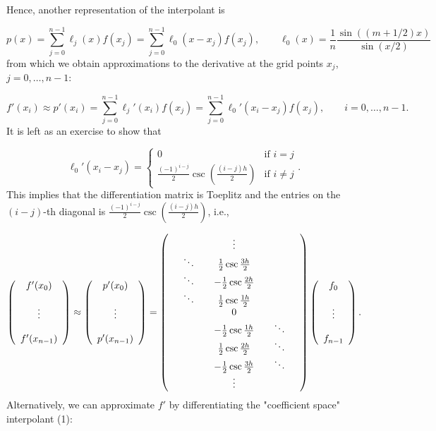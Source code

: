 \documentclass[12pt,landscape]{article}
\begin{document}
{Hence, another representation of the interpolant is

\[
p(x) = \sum_{j=0}^{n-1}\ell_j(x)f(x_j) = \sum_{j=0}^{n-1}\ell_0(x-x_j)f(x_j), \qquad \ell_0(x) = \frac{1}{n}\frac{\sin((m+1/2)x)}{\sin(x/2)}
\]
from which we obtain approximations to the derivative at the grid points $x_j$, $j = 0, \ldots, n-1$:

\[
f'(x_i) \approx p'(x_i) = \sum_{j=0}^{n-1}\ell_{j}'(x_i) f(x_{j})  = \sum_{j=0}^{n-1}\ell_{0}'(x_i-x_j)f(x_{j}), \qquad i = 0, \ldots, n-1.
\]
It is left as an exercise to show that

\[
\ell_{0}'(x_i-x_j) = \begin{cases}
 0 & \text{if } i = j \\
 \frac{(-1)^{i-j}}{2}\csc\left( \frac{(i-j)h}{2} \right)  & \text{if } i\neq j
\end{cases}.
\]
This implies that the differentiation matrix is Toeplitz and the entries on the $(i-j)$-th diagonal is $\frac{(-1)^{i-j}}{2}\csc\left( \frac{(i-j)h}{2} \right)$, i.e.,

\[
\left(
\begin{array}{c}
f'(x_0) \\
  \\
\vdots  \\
  \\
f'(x_{n-1})
\end{array}
\right) \approx 
\left(
\begin{array}{c}
p'(x_0) \\
  \\
\vdots  \\
  \\
p'(x_{n-1})
\end{array}
\right) = 
\left(
\begin{array}{c c c c c c c}
  &       &       & \vdots  &   &   & \\
  &\ddots &       & \frac{1}{2}\csc \frac{3h}{2}   &   &    &  \\
   &\ddots &      &-\frac{1}{2}\csc \frac{2h}{2}   &   &    &  \\ 
   &\ddots &      & \frac{1}{2}\csc \frac{1h}{2}   &   &    &   \\
  &        &      & 0                              &   &    &   \\
&      &      & -\frac{1}{2}\csc \frac{1h}{2}   &   &   \ddots &  \\
&      &      & \frac{1}{2}\csc \frac{2h}{2}   &   &   \ddots &  \\
&      &      & -\frac{1}{2}\csc \frac{3h}{2}   &   &   \ddots &  \\
&      &      & \vdots  &   &    &  \\
\end{array}
\right)
\left(
\begin{array}{c}
f_0 \\
  \\
\vdots  \\
  \\
f_{n-1}
\end{array}
\right).
\]
Alternatively, we can approximate $f'$ by differentiating the "coefficient space" interpolant (1):

}
\end{document}
